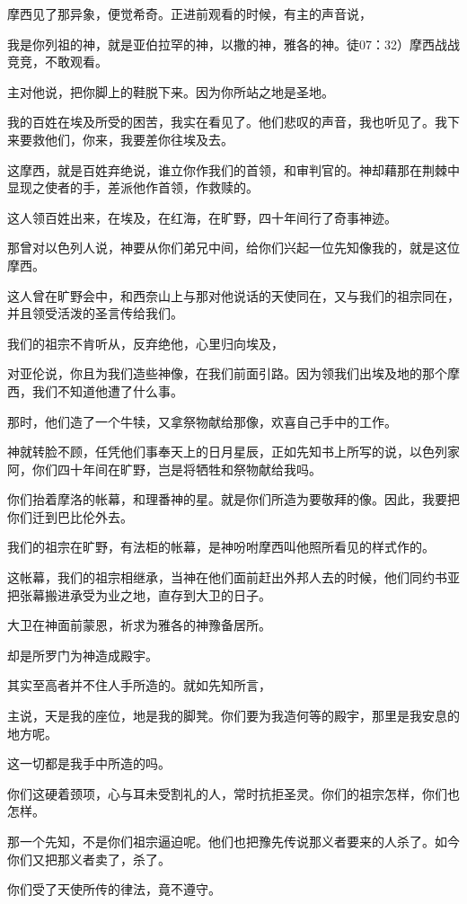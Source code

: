 \documentclass[12pt,oneside]{book}
\begin{document}
摩西见了那异象，便觉希奇。正进前观看的时候，有主的声音说，

我是你列祖的神，就是亚伯拉罕的神，以撒的神，雅各的神。徒07：32）摩西战战竞竞，不敢观看。

主对他说，把你脚上的鞋脱下来。因为你所站之地是圣地。

我的百姓在埃及所受的困苦，我实在看见了。他们悲叹的声音，我也听见了。我下来要救他们，你来，我要差你往埃及去。

这摩西，就是百姓弃绝说，谁立你作我们的首领，和审判官的。神却藉那在荆棘中显现之使者的手，差派他作首领，作救赎的。

这人领百姓出来，在埃及，在红海，在旷野，四十年间行了奇事神迹。

那曾对以色列人说，神要从你们弟兄中间，给你们兴起一位先知像我的，就是这位摩西。

这人曾在旷野会中，和西奈山上与那对他说话的天使同在，又与我们的祖宗同在，并且领受活泼的圣言传给我们。

我们的祖宗不肯听从，反弃绝他，心里归向埃及，

对亚伦说，你且为我们造些神像，在我们前面引路。因为领我们出埃及地的那个摩西，我们不知道他遭了什么事。

那时，他们造了一个牛犊，又拿祭物献给那像，欢喜自己手中的工作。

神就转脸不顾，任凭他们事奉天上的日月星辰，正如先知书上所写的说，以色列家阿，你们四十年间在旷野，岂是将牺牲和祭物献给我吗。

你们抬着摩洛的帐幕，和理番神的星。就是你们所造为要敬拜的像。因此，我要把你们迁到巴比伦外去。

我们的祖宗在旷野，有法柜的帐幕，是神吩咐摩西叫他照所看见的样式作的。

这帐幕，我们的祖宗相继承，当神在他们面前赶出外邦人去的时候，他们同约书亚把张幕搬进承受为业之地，直存到大卫的日子。

大卫在神面前蒙恩，祈求为雅各的神豫备居所。

却是所罗门为神造成殿宇。

其实至高者并不住人手所造的。就如先知所言，

主说，天是我的座位，地是我的脚凳。你们要为我造何等的殿宇，那里是我安息的地方呢。

这一切都是我手中所造的吗。

你们这硬着颈项，心与耳未受割礼的人，常时抗拒圣灵。你们的祖宗怎样，你们也怎样。

那一个先知，不是你们祖宗逼迫呢。他们也把豫先传说那义者要来的人杀了。如今你们又把那义者卖了，杀了。

你们受了天使所传的律法，竟不遵守。
\end{document}
